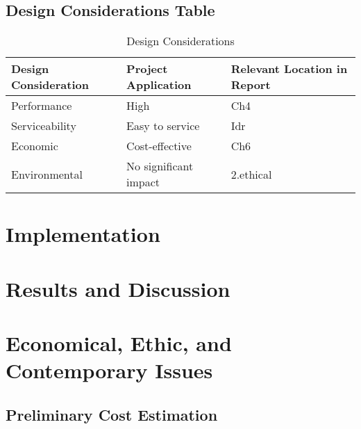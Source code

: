 \documentclass[12pt]{report}
\begin{document}
\section{Design Considerations Table}
\begin{table}[h]
    \centering
    \begin{tabular}{|>{\centering\arraybackslash}m{5cm}|>{\centering\arraybackslash}m{5cm}|>{\centering\arraybackslash}m{5cm}|}
        \hline
        \textbf{Design Consideration} & \textbf{Project Application} & \textbf{Relevant Location in Report} \\
        \hline
        Performance & High & Ch4 \\
        \hline
        Serviceability & Easy to service & Idr \\
        \hline
        Economic & Cost-effective & Ch6 \\
        \hline
        Environmental & No significant impact & 2.ethical \\
        \hline
    \end{tabular}
    \caption{Design Considerations}
    \label{tab:design_considerations}
\end{table}
\chapter{Implementation}

\chapter{Results and Discussion}

\chapter{Economical, Ethic, and Contemporary Issues}

\section{Preliminary Cost Estimation}
\end{document}

